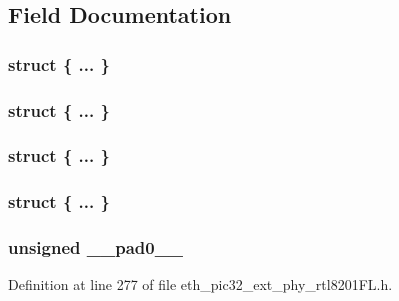 \subsection{Field Documentation}
\hypertarget{union_____a_n_n_p_t_rbits__t_a610a7b8844ae1f79b906205ab1c1b98c}{}\subsubsection[{"@132}]{\setlength{\rightskip}{0pt plus 5cm}struct \{ ... \} }\label{union_____a_n_n_p_t_rbits__t_a610a7b8844ae1f79b906205ab1c1b98c}
\hypertarget{union_____a_n_n_p_t_rbits__t_ac50d4e21309e65a97425da2529e0d575}{}\subsubsection[{"@134}]{\setlength{\rightskip}{0pt plus 5cm}struct \{ ... \} }\label{union_____a_n_n_p_t_rbits__t_ac50d4e21309e65a97425da2529e0d575}
\hypertarget{union_____a_n_n_p_t_rbits__t_a1eda178fba197fbf39bf7188339baa9e}{}\subsubsection[{"@204}]{\setlength{\rightskip}{0pt plus 5cm}struct \{ ... \} }\label{union_____a_n_n_p_t_rbits__t_a1eda178fba197fbf39bf7188339baa9e}
\hypertarget{union_____a_n_n_p_t_rbits__t_af7ef6676a7d991883beef31b776815a7}{}\subsubsection[{"@206}]{\setlength{\rightskip}{0pt plus 5cm}struct \{ ... \} }\label{union_____a_n_n_p_t_rbits__t_af7ef6676a7d991883beef31b776815a7}
\hypertarget{union_____a_n_n_p_t_rbits__t_adf71f3d8410c1f1dbbc96680a92c49af}{}
\subsubsection[{\+\_\+\+\_\+pad0\+\_\+\+\_\+}]{\setlength{\rightskip}{0pt plus 5cm}unsigned \+\_\+\+\_\+pad0\+\_\+\+\_\+}\label{union_____a_n_n_p_t_rbits__t_adf71f3d8410c1f1dbbc96680a92c49af}


Definition at line 277 of file eth\+\_\+pic32\+\_\+ext\+\_\+phy\+\_\+rtl8201\+F\+L.\+h.

